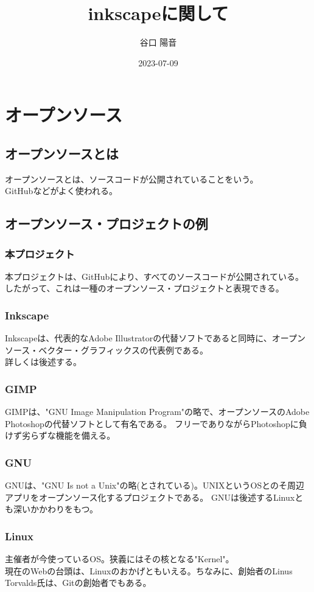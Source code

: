 \documentclass{ltjsarticle}
\begin{document}
\title{inkscapeに関して}
\author{谷口 陽音}
\date{2023-07-09}
\maketitle

\section{オープンソース}
\subsection{オープンソースとは}
オープンソースとは、ソースコードが公開されていることをいう。\\
GitHubなどがよく使われる。
\subsection{オープンソース・プロジェクトの例}
\subsubsection{本プロジェクト}
本プロジェクトは、GitHubにより、すべてのソースコードが公開されている。
したがって、これは一種のオープンソース・プロジェクトと表現できる。
\subsubsection{Inkscape}
Inkscapeは、代表的なAdobe Illustratorの代替ソフトであると同時に、オープンソース・ベクター・グラフィックスの代表例である。\\
詳しくは後述する。
\subsubsection{GIMP}
GIMPは、"GNU Image Manipulation Program"の略で、オープンソースのAdobe Photoshopの代替ソフトとして有名である。
フリーでありながらPhotoshopに負けず劣らずな機能を備える。 
\subsubsection{GNU}
GNUは、"GNU Is not a Unix"の略(とされている)。UNIXというOSとのそ周辺アプリをオープンソース化するプロジェクトである。
GNUは後述するLinuxとも深いかかわりをもつ。
\subsubsection{Linux}
主催者が今使っているOS。狭義にはその核となる"Kernel"。\\
現在のWebの台頭は、Linuxのおかげともいえる。ちなみに、創始者のLinus Torvalds氏は、Gitの創始者でもある。
\end{document}
